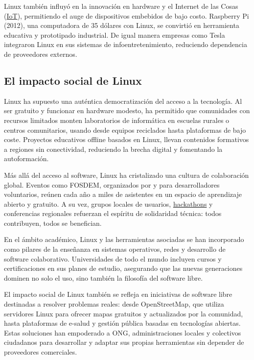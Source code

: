 \documentclass[a4paper,12pt]{article}
\begin{document}
Linux también influyó en la innovación en hardware y el Internet de las Cosas
(\hyperlink{iot}{IoT}), permitiendo el auge de dispositivos embebidos de bajo costo. Raspberry Pi
(2012), una computadora de 35 dólares con Linux, se convirtió en herramienta
educativa y prototipado industrial. De igual manera empresas como Tesla
integraron Linux en sus sistemas de infoentretenimiento, reduciendo dependencia
de proveedores externos. 

\subsection{El impacto social de Linux}

Linux ha supuesto una auténtica democratización del acceso a la tecnología. Al
ser gratuito y funcionar en hardware modesto, ha permitido que comunidades con
recursos limitados monten laboratorios de informática en escuelas rurales o
centros comunitarios, usando desde equipos reciclados hasta plataformas de bajo
coste. Proyectos educativos offline basados en Linux, llevan contenidos
formativos a regiones sin conectividad, reduciendo la brecha digital y 
fomentando la autoformación.

Más allá del acceso al software, Linux ha cristalizado una cultura de
colaboración global.  Eventos como FOSDEM, organizados por y para
desarrolladores voluntarios, reúnen cada año a miles de asistentes en un espacio
de aprendizaje abierto y gratuito. A su vez, grupos locales de usuarios,
\hyperlink{hackathon}{hackathons} y conferencias regionales refuerzan el
espíritu de solidaridad técnica: todos contribuyen, todos se benefician.

En el ámbito académico, Linux y las herramientas asociadas se han incorporado
como pilares de la enseñanza en sistemas operativos, redes y desarrollo de
software colaborativo. Universidades de todo el mundo incluyen cursos y
certificaciones en sus planes de estudio, asegurando que las nuevas generaciones
dominen no solo el uso, sino también la filosofía del software libre.

El impacto social de Linux también se refleja en iniciativas de software libre
destinadas a resolver problemas reales: desde OpenStreetMap, que utiliza
servidores Linux para ofrecer mapas gratuitos y actualizados por la comunidad,
hasta plataformas de e-salud y gestión pública basadas en tecnologías abiertas.
Estas soluciones han empoderado a ONG, administraciones locales y colectivos 
ciudadanos para desarrollar y adaptar sus propias herramientas sin depender de
proveedores comerciales.
\end{document}
